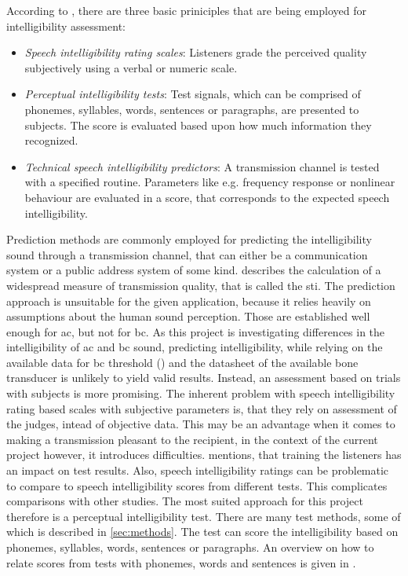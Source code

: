 According to \citep{arl_us_army}, there are three basic priniciples that are being employed for intelligibility assessment:
\begin{itemize}
\item \textit{Speech intelligibility rating scales}: Listeners grade the perceived quality subjectively using a verbal or numeric scale.
\item \textit{Perceptual intelligibility tests}:  Test signals, which can be comprised of phonemes, syllables, words, sentences or paragraphs, are presented to subjects. The score is evaluated based upon how much information they recognized.
\item \textit{Technical speech intelligibility predictors}: A transmission channel is tested with a specified routine. Parameters like e.g. frequency response or nonlinear behaviour are evaluated in a score, that corresponds to the expected speech intelligibility.
\end{itemize}
Prediction methods are commonly employed for predicting the intelligibility sound through a transmission channel, that can either be a communication system or a public address system of some kind. \citep{iec_60268} describes the calculation of a widespread measure of transmission quality, that is called the \gls{sti}. 
The prediction approach is unsuitable for the given application, because it relies heavily on assumptions about the human sound perception. Those are established well enough for \gls{ac}, but not for \gls{bc}. As this project is investigating differences in the intelligibility of \gls{ac} and \gls{bc} sound, predicting intelligibility, while relying on the available data for \gls{bc} threshold (\citep{iso_389-3}) and the datasheet of the available bone transducer is unlikely to yield valid results.
Instead, an assessment based on trials with subjects is more promising.
The inherent problem with speech intelligibility rating based scales with subjective parameters is, that they rely on assessment of the judges, intead of objective data. This may be an advantage when it comes to making a transmission pleasant to the recipient, in the context of the current project however, it introduces difficulties.
\citep[Sec. 5.1]{arl_us_army} mentions, that training the listeners has an impact on test results. Also, speech intelligibility ratings can be problematic to compare to speech intelligibility scores from different tests. This complicates comparisons with other studies.
The most suited approach for this project therefore is a perceptual intelligibility test. There are many test methods, some of which is described in \autoref{sec:methods}. The test can score the intelligibility based on phonemes, syllables, words, sentences or paragraphs. An overview on how to relate scores from tests with phonemes, words and sentences is given in \citep{olsen_1997}.


